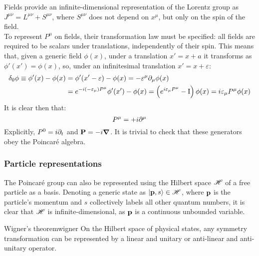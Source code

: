 Fields provide an infinite-dimensional representation of the Lorentz group as $ J^{\mu \nu} = L^{\mu \nu} + S^{\mu \nu} $, where $ S^{\mu \nu} $ does not depend on $ x^\mu $, but only on the spin of the field.\\
To represent $ P^\mu $ on fields, their transformation law must be specified: all fields are required to be scalars under translations, independently of their spin. This means that, given a generic field $ \phi(x) $, under a translation $ x' = x + a $ it transforms as $ \phi'(x') = \phi(x) $, so, under an infinitesimal translation $ x' = x + \varepsilon $:
\begin{equation*}
  \begin{split}
    \delta_0 \phi \equiv \phi'(x) - \phi(x) &= \phi'(x' - \varepsilon) - \phi(x) = - \varepsilon^\mu \partial_\mu \phi(x) \\
                                            &= e^{-i (-\varepsilon_\mu) P^\mu} \phi'(x') - \phi(x) = \left( e^{i \varepsilon_\mu P^\mu} - \mathrm{I} \right) \phi(x) = i \varepsilon_\mu P^\mu \phi(x)
  \end{split}
\end{equation*}
It is clear then that:
\begin{equation}
  P^\mu = +i \partial^\mu
\end{equation}
Explicitly, $ P^0 = i \partial_t $ and $ \mathbf{P} = - i \boldsymbol{\nabla} $. It is trivial to check that these generators obey the Poincaré algebra.

\subsubsection{Particle representations}

The Poincaré group can also be represented using the Hilbert space $ \mathscr{H} $ of a free particle as a basis. Denoting a generic state as $ \ket{\mathbf{p},s} \in \mathscr{H} $, where $ \mathbf{p} $ is the particle's momentum and $ s $ collectively labels all other quantum numbers, it is clear that $ \mathscr{H} $ is infinite-dimensional, as $ \mathbf{p} $ is a continuous unbounded variable.

\begin{theorem}{Wigner's theorem}{wigner}
  On the Hilbert space of physical states, any symmetry transformation can be represented by a linear and unitary or anti-linear and anti-unitary operator.
\end{theorem}


